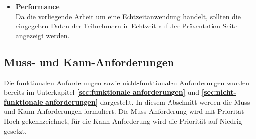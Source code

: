 \begin{itemize}
\item \textbf{Performance}\\
Da die vorliegende Arbeit um eine Echtzeitanwendung handelt, sollten die eingegeben Daten der Teilnehmern in Echtzeit auf der Präsentation-Seite angezeigt werden.
\end{itemize}

\subsection{Muss- und Kann-Anforderungen}
\label{muss- und kann-Anforderungen}
Die funktionalen Anforderungen sowie nicht-funktionalen Anforderungen wurden bereits im Unterkapitel \textbf{\ref{sec:funktionale anforderungen}} und \textbf{\ref{sec:nicht-funktionale anforderungen}} dargestellt. In diesem Abschnitt werden die Muss- und Kann-Anforderungen formuliert. Die Muss-Anforderung wird mit Priorität \glqq Hoch\grqq{} gekennzeichnet, für die Kann-Anforderung wird die Priorität auf \glqq Niedrig\grqq{} gesetzt.

